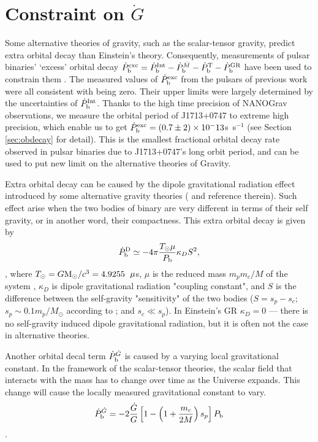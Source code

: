 \section{Constraint on $\dot{G}$}
\label{sec:Gdot}
Some alternative theories of gravity, such as the scalar-tensor gravity, predict extra orbital decay than Einstein's theory. 
Consequently, measurements of pulsar binaries' `excess' orbital decay
$\dot{P}_{\rm b}^{\rm exc}=\dot{P}_{\rm b}^{\rm Int} - \dot{P}_{\rm
b}^{\dot{M}}  - \dot{P}_{\rm b}^{\rm T} - \dot{P}_{\rm b}^{\rm GR}$ have been
used to constrain them \citep{lwj+09, fwe+12}. 
The measured values of $\dot{P}_{\rm b}^{\rm exc}$ from the pulsars of
previous work were all consistent with being zero. Their upper limits were largely determined by the uncertainties of $\dot{P}_{\rm b}^{\rm Int}$.
Thanks to the high time precision of NANOGrav observations, we measure the
orbital period of J1713+0747 to extreme high precision, which enable us to 
get $\dot{P}_{\rm b}^{\rm exc}=(0.7\pm2)\times10^-13$s~s$^{-1}$ (see Section
\ref{sec:obdecay} for detail). 
This is the smallest fractional orbital decay rate observed in pulsar binaries
due to J1713+0747's long orbit period, and can be used to put new limit on
the alternative theories of Gravity.

Extra orbital decay can be caused by the dipole gravitational radiation effect
introduced by some alternative gravity theories (\citealt{Will93, Will01, lwj+09, fwe+12} and reference therein). Such effect arise when the two bodies of binary are very different in terms of their self gravity, or in another word, their compactness.
This extra orbital decay is given by 
\begin{equation}
\dot{P}_{\rm b}^{\rm D} \simeq -4\pi\frac{T_{\odot}\mu}{P_{\rm b}}\kappa_D S^2,
\end{equation}
\citep{lwj+09}, where $T_{\odot}=G{\rm M_{\odot}}/c^3=4.9255$~${\rm \mu}$s, $\mu$ is the reduced mass $m_pm_c/M$ of the system , $\kappa_D $ is dipole
gravitational radiation "coupling constant", and $S$ is the difference
between the self-gravity "sensitivity" of the two bodies ($S = s_p - s_c$;
$s_p\sim0.1m_p/M_{\odot}$ according to \citealt{de92} ; and $s_c\ll s_p$).
In Einstein's GR $\kappa_D=0$ --- there is no self-gravity induced
dipole gravitational radiation, but it is often not the case in alternative
theories.

Another orbital decal term $\dot{P}_{\rm b}^{\dot{G}}$ is caused by a varying
local gravitational constant. In the framework of the scalar-tensor theories,
the scalar field that interacts with the mass has to change over time as the
Universe expands. This change will cause the locally measured gravitational
constant to vary. 
\begin{equation}
\dot{P}_{\rm b}^{\dot{G}} = -2 \frac{\dot{G}}{G}
\left[1-\left(1+\frac{m_c}{2M}\right)s_p\right]P_{\rm b}
\end{equation}
\citep{dgt88,nor90}.

